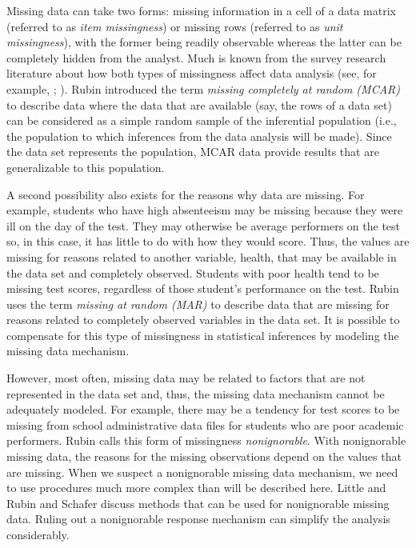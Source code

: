 \documentclass[]{krantz}
\begin{document}
Missing data can take two forms: missing information in a cell of a data
matrix (referred to as \emph{item missingness}) or missing rows
(referred to as \emph{unit missingness}), with the former being readily
observable whereas the latter can be completely hidden from the analyst.
Much is known from the survey research literature about how both types
of missingness affect data analysis (see, for example,
\citet{little2014statistical}; \citet{rubin1976}). Rubin
\citeyearpar{rubin1976} introduced the term \emph{missing completely at
random (MCAR)} to describe data where the data that are available (say,
the rows of a data set) can be considered as a simple random sample of
the inferential population (i.e., the population to which inferences
from the data analysis will be made). Since the data set represents the
population, MCAR data provide results that are generalizable to this
population.

A second possibility also exists for the reasons why data are missing.
For example, students who have high absenteeism may be missing because
they were ill on the day of the test. They may otherwise be average
performers on the test so, in this case, it has little to do with how
they would score. Thus, the values are missing for reasons related to
another variable, health, that may be available in the data set and
completely observed. Students with poor health tend to be missing test
scores, regardless of those student's performance on the test. Rubin
\citeyearpar{rubin1976} uses the term \emph{missing at random (MAR)} to
describe data that are missing for reasons related to completely
observed variables in the data set. It is possible to compensate for
this type of missingness in statistical inferences by modeling the
missing data mechanism.

However, most often, missing data may be related to factors that are not
represented in the data set and, thus, the missing data mechanism cannot
be adequately modeled. For example, there may be a tendency for test
scores to be missing from school administrative data files for students
who are poor academic performers. Rubin calls this form of missingness
\emph{nonignorable}. With nonignorable missing data, the reasons for the
missing observations depend on the values that are missing. When we
suspect a nonignorable missing data mechanism, we need to use procedures
much more complex than will be described here. Little and Rubin
\citeyearpar{little2014statistical} and Schafer
\citeyearpar{schafer1997analysis} discuss methods that can be used for
nonignorable missing data. Ruling out a nonignorable response mechanism
can simplify the analysis considerably.
\end{document}
